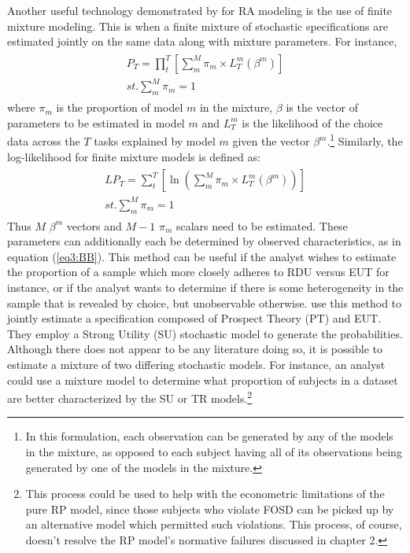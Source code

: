 \documentclass[../main.tex]{subfiles}
\begin{document}
Another useful technology demonstrated by \textcite{Harrison2009} for RA modeling is the use of finite mixture modeling.
This is when a finite mixture of stochastic specifications are estimated jointly on the same data along with mixture parameters.
For instance,
\begin{align}
	\label{eq3:PT_Mix}
	\begin{split}
		\bm{\mathit{P_T}} = \prod_t^T \left[ \sum_m^M \pi_m \times L_T^m(\beta^m) \right]\\
		\mathit{st.} \sum_m^M \pi_m = 1
	\end{split}
\end{align}
\noindent where $\pi_m$ is the proportion of model $m$ in the mixture, $\beta$ is the vector of parameters to be estimated in model $m$ and $L_T^m$ is the likelihood of the choice data across the $T$ tasks explained by model $m$ given the vector $\beta^m$.\footnote{
	In this formulation, each observation can be generated by any of the models in the mixture, as opposed to each subject having all of its observations being generated by one of the models in the mixture.
}
Similarly, the log-likelihood for finite mixture models is defined as:
\begin{align}
	\label{eq3:LPT_Mix}
	\begin{split}
		\bm{\mathit{LP_T}} = \sum_t^T \left[ \ln \left( \sum_m^M \pi_m \times L_T^m(\beta^m) \right) \right]\\
		\mathit{st.} \sum_m^M \pi_m = 1
	\end{split}
\end{align}
\noindent Thus $M$ $\beta^m$ vectors and $M-1$ $\pi_m$ scalars need to be estimated.
These parameters can additionally each be determined by observed characteristics, as in equation (\ref{eq3:BB}).
This method can be useful if the analyst wishes to estimate the proportion of a sample which more closely adheres to RDU versus EUT for instance, or if the analyst wants to determine if there is some heterogeneity in the sample that is revealed by choice, but unobservable otherwise.
\textcite[141]{Harrison2009} use this method to jointly estimate a specification composed of Prospect Theory (PT) and EUT.
They employ a Strong Utility (SU) stochastic model to generate the probabilities.
Although there does not appear to be any literature doing so, it is possible to estimate a mixture of two differing stochastic models.
For instance, an analyst could use a mixture model to determine what proportion of subjects in a dataset are better characterized by the SU or TR models.\footnote{
	This process could be used to help with the econometric limitations of the pure RP model, since those subjects who violate FOSD can be picked up by an alternative model which permitted such violations.
	This process, of course, doesn't resolve the RP model's normative failures discussed in chapter 2.
}
\end{document}
